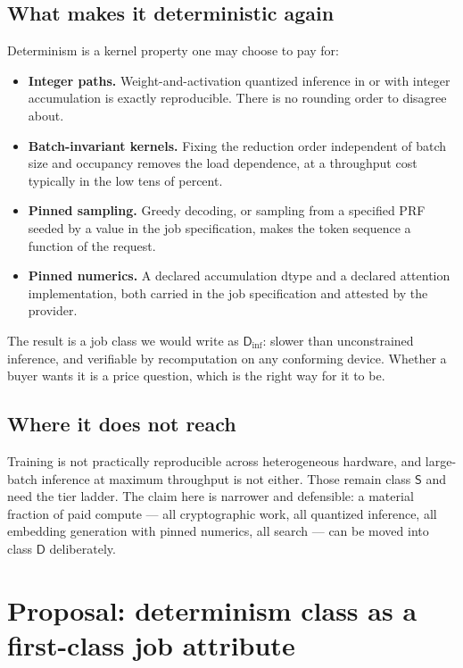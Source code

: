 \documentclass[11pt,a4paper]{article}
\begin{document}
\subsection{What makes it deterministic again}

Determinism is a kernel property one may choose to pay for:

\begin{itemize}[leftmargin=1.4em]
\item \textbf{Integer paths.} Weight-and-activation quantized inference in
       or  with integer accumulation is exactly
      reproducible. There is no rounding order to disagree about.
\item \textbf{Batch-invariant kernels.} Fixing the reduction order independent of
      batch size and occupancy removes the load dependence, at a throughput cost
      typically in the low tens of percent.
\item \textbf{Pinned sampling.} Greedy decoding, or sampling from a specified PRF
      seeded by a value in the job specification, makes the token sequence a
      function of the request.
\item \textbf{Pinned numerics.} A declared accumulation dtype and a declared
      attention implementation, both carried in the job specification and
      attested by the provider.
\end{itemize}

The result is a job class we would write as $\mathsf{D}_{\text{inf}}$: slower
than unconstrained inference, and verifiable by recomputation on any conforming
device. Whether a buyer wants it is a price question, which is the right way for
it to be.

\subsection{Where it does not reach}

Training is not practically reproducible across heterogeneous hardware, and
large-batch  inference at maximum throughput is not either. Those
remain class $\mathsf{S}$ and need the tier ladder. The claim here is narrower
and defensible: a material fraction of paid compute --- all cryptographic work,
all quantized inference, all embedding generation with pinned numerics, all
search --- can be moved into class $\mathsf{D}$ deliberately.

\section{Proposal: determinism class as a first-class job attribute}
\end{document}
